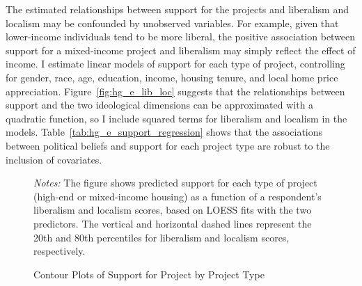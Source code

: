 \documentclass[article,12pt]{memoir}
\begin{document}

The estimated relationships between support for the projects and liberalism and localism may be confounded by unobserved variables. For example, given that lower-income individuals tend to be more liberal, the positive association between support for a mixed-income project and liberalism may simply reflect the effect of income.  I estimate linear models of support for each type of project, controlling for gender, race, age, education, income, housing tenure, and local home price appreciation.  Figure~\ref{fig:hg_e_lib_loc} suggests that the relationships between support and the two ideological dimensions can be approximated with a quadratic function, so I include squared terms for liberalism and localism in the models.  Table~\ref{tab:hg_e_support_regression} shows that the associations between political beliefs and support for each project type are robust to the inclusion of covariates.


\begin{figure}[t]
  \caption{Contour Plots of Support for Project by Project Type}
  \label{fig:hg_e_contour}
  \begin{measuredfigure}
  \end{measuredfigure}
  \begin{tablenotes}[flushleft]
    \item \hspace{-.2em}\emph{Notes:} The figure shows predicted support for each type of project (high-end or mixed-income housing) as a function of a respondent's liberalism and localism scores, based on LOESS fits with the two predictors.  The vertical and horizontal dashed lines represent the 20th and 80th percentiles for liberalism and localism scores, respectively.
  \end{tablenotes}
\end{figure}
\end{document}
